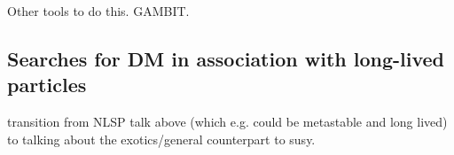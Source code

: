 Other tools to do this. GAMBIT.

\subsection{Searches for DM in association with long-lived particles}
\label{sec:results_LLPSearches}

transition from NLSP talk above (which e.g. could be metastable and long lived) to talking about the exotics/general counterpart to susy.



%
%
%
%
%


%
%
%
%
%




